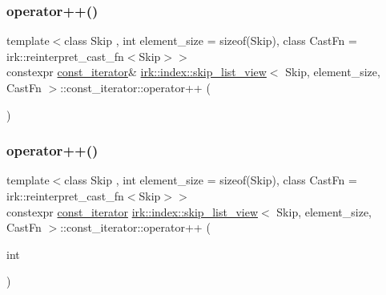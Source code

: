 \mbox{\label{structirk_1_1index_1_1skip__list__view_1_1const__iterator_a9f2eff52bff4e4193fa0f89df869a7df}} 
\subsubsection{\texorpdfstring{operator++()}{operator++()}\hspace{0.1cm}{\footnotesize\ttfamily [1/2]}}
{\footnotesize\ttfamily template$<$class Skip , int element\+\_\+size = sizeof(\+Skip), class Cast\+Fn  = irk\+::reinterpret\+\_\+cast\+\_\+fn$<$\+Skip$>$$>$ \\
constexpr \mbox{\hyperlink{structirk_1_1index_1_1skip__list__view_1_1const__iterator}{const\+\_\+iterator}}\& \mbox{\hyperlink{classirk_1_1index_1_1skip__list__view}{irk\+::index\+::skip\+\_\+list\+\_\+view}}$<$ Skip, element\+\_\+size, Cast\+Fn $>$\+::const\+\_\+iterator\+::operator++ (\begin{DoxyParamCaption}{ }\end{DoxyParamCaption})\hspace{0.3cm}{\ttfamily [inline]}}

\mbox{\label{structirk_1_1index_1_1skip__list__view_1_1const__iterator_a6f847e33643ae607c0c9275edfa69696}} 
\subsubsection{\texorpdfstring{operator++()}{operator++()}\hspace{0.1cm}{\footnotesize\ttfamily [2/2]}}
{\footnotesize\ttfamily template$<$class Skip , int element\+\_\+size = sizeof(\+Skip), class Cast\+Fn  = irk\+::reinterpret\+\_\+cast\+\_\+fn$<$\+Skip$>$$>$ \\
constexpr \mbox{\hyperlink{structirk_1_1index_1_1skip__list__view_1_1const__iterator}{const\+\_\+iterator}} \mbox{\hyperlink{classirk_1_1index_1_1skip__list__view}{irk\+::index\+::skip\+\_\+list\+\_\+view}}$<$ Skip, element\+\_\+size, Cast\+Fn $>$\+::const\+\_\+iterator\+::operator++ (\begin{DoxyParamCaption}\item[{int}]{ }\end{DoxyParamCaption})\hspace{0.3cm}{\ttfamily [inline]}}

